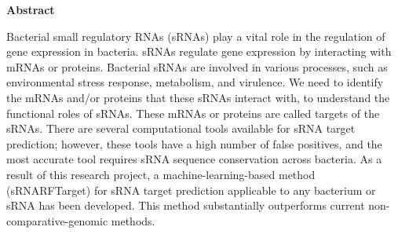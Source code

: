 \begin{center}
	\textbf{\large Abstract}
\end{center}
\noindent
Bacterial small regulatory RNAs (sRNAs) play a vital role in the regulation of gene expression in bacteria. sRNAs regulate gene expression by interacting with mRNAs or proteins. Bacterial sRNAs are involved in various processes, such as environmental stress response, metabolism, and virulence. We need to identify the mRNAs and/or proteins that these sRNAs interact with, to understand the functional roles of sRNAs. These mRNAs or proteins are called targets of the sRNAs. There are several computational tools available for sRNA target prediction; however, these tools have a high number of false positives, and the most accurate tool requires sRNA sequence conservation across bacteria. As a result of this research project, a machine-learning-based method (sRNARFTarget) for sRNA target prediction applicable to any bacterium or sRNA has been developed. This method substantially outperforms current non-comparative-genomic methods.